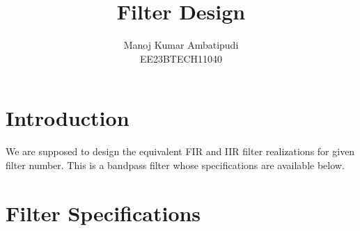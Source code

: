 \documentclass{article}
\begin{document}
\title{ \textbf{Filter Design}}

\author{Manoj Kumar Ambatipudi\\EE23BTECH11040}
\date{}

\maketitle
\section{Introduction}
We are supposed to design the equivalent FIR and IIR filter realizations for given filter number.  
This is a bandpass filter whose specifications are available below.

\section{Filter Specifications}
\end{document}
